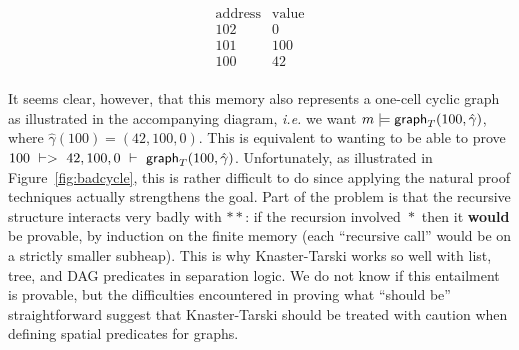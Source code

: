 \begin{wrapfigure}{r}{.39\textwidth}
\vspace{-1em} %
\begin{minipage}{.20\textwidth}
\qquad \[
\begin{array}{c|c}
\textrm{address} & \textrm{value} \\
\hline
102 & 0 \\
101 & 100 \\
100 & 42 \\
\end{array}
\]
\end{minipage}%
\begin{minipage}{.19\textwidth}
\centering
\end{minipage}
\vspace{-0.5em} %
\end{wrapfigure}

\noindent It seems clear, however, that this
memory also represents a one-cell cyclic graph as illustrated in the accompanying
diagram, \emph{i.e.} we want $m |= \mathsf{graph}_T(100,\hat{\gamma})$, where 
$\hat{\gamma}(100) = (42,100,0)$.  This is equivalent to wanting to be able to 
prove $100~|->~42,100,0~|-~\mathsf{graph}_T(100,\hat{\gamma})$.  Unfortunately, as 
illustrated in Figure~\ref{fig:badcycle}, this is rather difficult to do since 
applying the natural proof techniques actually strengthens the goal.
Part of the 
problem is that the recursive structure interacts very badly with $**$: if the 
recursion involved~$*$~then it \textbf{would} be provable, by induction on the 
finite memory (each ``recursive call'' would be on a strictly smaller subheap).  
This is why Knaster-Tarski works so well with list, tree, and DAG predicates in 
separation logic.  We do not know if this entailment is provable, but the 
difficulties encountered in proving what ``should be'' straightforward suggest 
that Knaster-Tarski should be treated with caution when defining spatial 
predicates for graphs.


